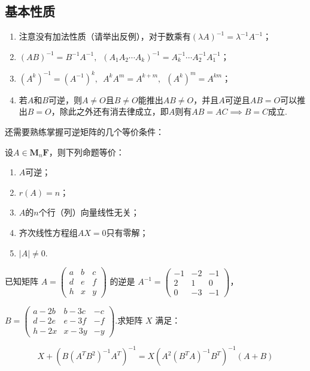 \subsection{基本性质}
\begin{enumerate}
    \item 注意没有加法性质（请举出反例），对于数乘有$(\lambda A)^{-1}=\lambda^{-1}A^{-1}$；

    \item $(AB)^{-1}=B^{-1}A^{-1},\enspace (A_1A_2\cdots A_k)^{-1}=A_k^{-1}\cdots A_2^{-1}A_1^{-1}$；

    \item $(A^k)^{-1}=(A^{-1})^k,\enspace A^kA^m=A^{k+m},\enspace (A^k)^m=A^{km}$；

    \item 若$A$和$B$可逆，则$A\neq O$且$B\neq O$能推出$AB\neq O$，并且$A$可逆且$AB=O$可以推出$B=O$，除此之外还有消去律成立，即$A$则有$AB=AC \implies B=C$成立.
\end{enumerate}

还需要熟练掌握可逆矩阵的几个等价条件：
\begin{theorem}
    设$A \in \mathbf{M}_n{\mathbf{F}}$，则下列命题等价：
    \begin{enumerate}
        \item $A$可逆；

        \item $r(A)=n$；

        \item $A$的$n$个行（列）向量线性无关；

        \item 齐次线性方程组$AX=0$只有零解；

        \item $|A|\neq 0$.
    \end{enumerate}
\end{theorem}
\begin{example}
    已知矩阵 $A=\begin{pmatrix}a & b & c \\ d & e & f \\ h & x & y\end{pmatrix}$ 的逆是 $A^{-1}=\begin{pmatrix}-1 & -2 & -1 \\ 2 & 1 & 0 \\ 0 & -3 & -1\end{pmatrix}$，

$B=\begin{pmatrix}a-2b & b-3c & -c \\ d-2e & e-3f & -f \\ h-2x & x-3y & -y\end{pmatrix}$.求矩阵 $X$ 满足：

\[X+\left(B(A^TB^2)^{-1}A^T\right)^{-1}=X\left(A^2(B^TA)^{-1}B^T\right)^{-1}(A+B)\]
\end{example}

